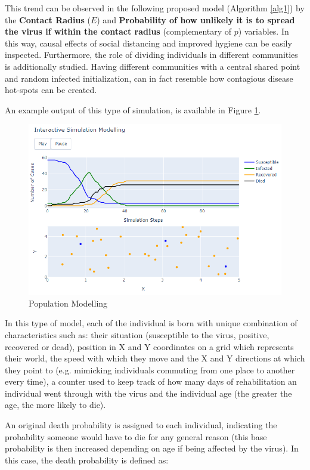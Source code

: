 This trend can be observed in the following proposed model (Algorithm \ref{alg1}) by the \textbf{Contact Radius} ($E$) and \textbf{Probability of how unlikely it is to spread the virus if within the contact radius} (complementary of $p$) variables.
In this way, causal effects of social distancing and improved hygiene can be easily inspected. Furthermore, the role of dividing individuals in different communities is additionally studied. Having different communities with a central shared point and random infected initialization, can in fact resemble how contagious disease hot-spots can be created.

An example output of this type of simulation, is available in Figure \ref{pop}.

\begin{figure}[ht!]%
    \centering
    \includegraphics[width=13cm]{latex/images/pop.PNG}%
    \caption{Population Modelling}
    \label{pop}
\end{figure}

In this type of model, each of the individual is born with unique combination of characteristics such as: their situation (susceptible to the virus, positive, recovered or dead), position in X and Y coordinates on a grid which represents their world, the speed with which they move and the X and Y directions at which they point to (e.g. mimicking individuals commuting from one place to another every time), a counter used to keep track of how many days of rehabilitation an individual went through with the virus and the individual age (the greater the age, the more likely to die). 

An original death probability is assigned to each individual, indicating the probability someone would have to die for any general reason (this base probability is then increased depending on age if being affected by the virus). In this case, the death probability is defined as:

